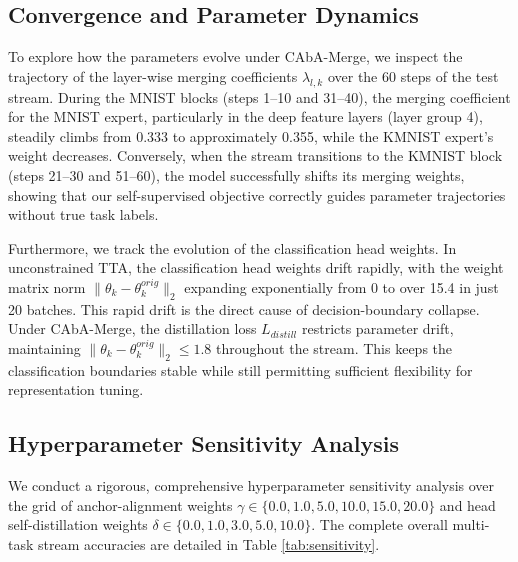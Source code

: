 \documentclass{article}
\theoremstyle{plain}
\theoremstyle{definition}
\theoremstyle{remark}
\begin{document}
\subsection{Convergence and Parameter Dynamics}
To explore how the parameters evolve under CAbA-Merge, we inspect the trajectory of the layer-wise merging coefficients $\lambda_{l, k}$ over the 60 steps of the test stream. 
During the MNIST blocks (steps 1--10 and 31--40), the merging coefficient for the MNIST expert, particularly in the deep feature layers (layer group 4), steadily climbs from 0.333 to approximately 0.355, while the KMNIST expert's weight decreases. Conversely, when the stream transitions to the KMNIST block (steps 21--30 and 51--60), the model successfully shifts its merging weights, showing that our self-supervised objective correctly guides parameter trajectories without true task labels.

Furthermore, we track the evolution of the classification head weights. In unconstrained TTA, the classification head weights drift rapidly, with the weight matrix norm $\|\theta_k - \theta_k^{orig}\|_2$ expanding exponentially from 0 to over 15.4 in just 20 batches. This rapid drift is the direct cause of decision-boundary collapse. Under CAbA-Merge, the distillation loss $L_{distill}$ restricts parameter drift, maintaining $\|\theta_k - \theta_k^{orig}\|_2 \le 1.8$ throughout the stream. This keeps the classification boundaries stable while still permitting sufficient flexibility for representation tuning.

\subsection{Hyperparameter Sensitivity Analysis}
We conduct a rigorous, comprehensive hyperparameter sensitivity analysis over the grid of anchor-alignment weights $\gamma \in \{0.0, 1.0, 5.0, 10.0, 15.0, 20.0\}$ and head self-distillation weights $\delta \in \{0.0, 1.0, 3.0, 5.0, 10.0\}$. The complete overall multi-task stream accuracies are detailed in Table \ref{tab:sensitivity}.
\end{document}
